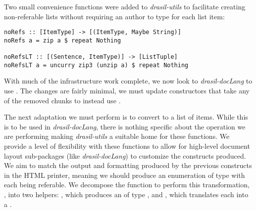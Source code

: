Two small convenience functions were added to \textit{drasil-utils} to facilitate creating non-referable lists without requiring an author to type  for each list item:

\begin{tcolorbox}
\begin{verbatim}
noRefs :: [ItemType] -> [(ItemType, Maybe String)]
noRefs a = zip a $ repeat Nothing

noRefsLT :: [(Sentence, ItemType)] -> [ListTuple]
noRefsLT a = uncurry zip3 (unzip a) $ repeat Nothing
\end{verbatim}
\end{tcolorbox}

With much of the infrastructure work complete, we now look to \textit{drasil-docLang} to use . The changes are fairly minimal, we must update  constructors that take any of the removed chunks to instead use . 

The next adaptation we must perform is to convert  to a list of  items. While this is to be used in \textit{drasil-docLang}, there is nothing specific about the operation we are performing making \textit{drasil-utils} a suitable home for these functions. We provide a level of flexibility with these functions to allow for high-level document layout sub-packages (like \textit{drasil-docLang}) to customize the  constructs produced. We aim to match the output and formatting produced by the previous   constructs in the HTML printer, meaning we should produce an enumeration of type  with each  being referable. We decompose the function to perform this transformation, , into two helpers: , which produces an  of type , and , which translates each  into a .


